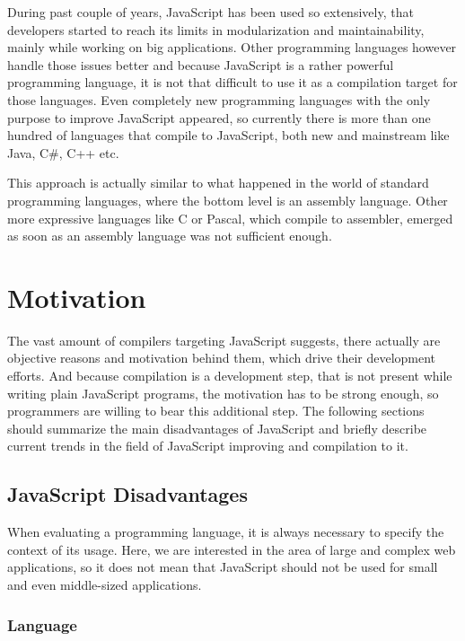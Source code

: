\documentclass[12pt,a4paper]{report}
\begin{document}
During past couple of years, JavaScript has been used so extensively, that developers started to reach its limits in modularization and maintainability, mainly while working on big applications. Other programming languages however handle those issues better and because JavaScript is a rather powerful programming language, it is not that difficult to use it as a compilation target for those languages. Even completely new programming languages with the only purpose to improve JavaScript appeared, so currently there is more than one hundred of languages that compile to JavaScript\cite{Backends}, both new and mainstream like Java, C\#, C++ etc.

This approach is actually similar to what happened in the world of standard programming languages, where the bottom level is an assembly language. Other more expressive languages like C or Pascal, which compile to assembler, emerged as soon as an assembly language was not sufficient enough.

\section{Motivation}
\label{sec:Motivation}

The vast amount of compilers targeting JavaScript suggests, there actually are objective reasons and motivation behind them, which drive their development efforts. And because compilation is a development step, that is not present while writing plain JavaScript programs, the motivation has to be strong enough, so programmers are willing to bear this additional step. The following sections should summarize the main disadvantages of JavaScript and briefly describe current trends in the field of JavaScript improving and compilation to it.

\subsection{JavaScript Disadvantages}

When evaluating a programming language, it is always necessary to specify the context of its usage. Here, we are interested in the area of large and complex web applications, so it does not mean that JavaScript should not be used for small and even middle-sized applications.

\subsubsection*{Language} 
\end{document}
